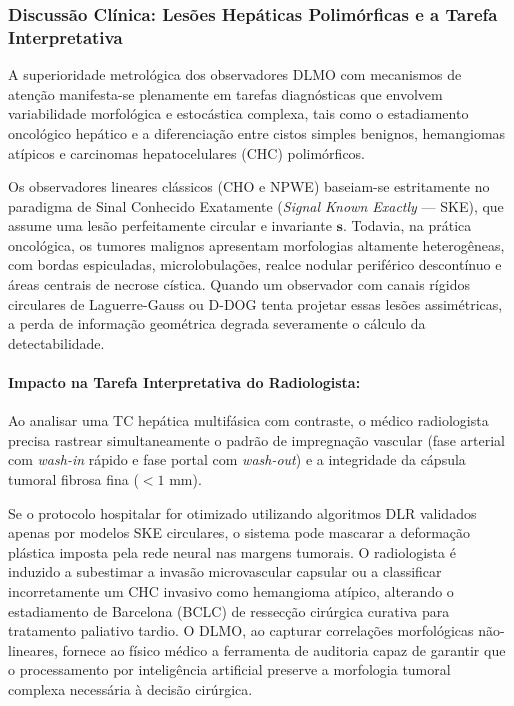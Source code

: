\documentclass[
  12pt,
  a4paper,
  oneside
]{report}
\begin{document}
\subsubsection{Discussão Clínica: Lesões Hepáticas Polimórficas e a Tarefa Interpretativa}
A superioridade metrológica dos observadores DLMO com mecanismos de atenção manifesta-se plenamente em tarefas diagnósticas que envolvem variabilidade morfológica e estocástica complexa, tais como o estadiamento oncológico hepático e a diferenciação entre cistos simples benignos, hemangiomas atípicos e carcinomas hepatocelulares (CHC) polimórficos.

Os observadores lineares clássicos (CHO e NPWE) baseiam-se estritamente no paradigma de Sinal Conhecido Exatamente (\emph{Signal Known Exactly} --- SKE), que assume uma lesão perfeitamente circular e invariante $\mathbf{s}$. Todavia, na prática oncológica, os tumores malignos apresentam morfologias altamente heterogêneas, com bordas espiculadas, microlobulações, realce nodular periférico descontínuo e áreas centrais de necrose cística. Quando um observador com canais rígidos circulares de Laguerre-Gauss ou D-DOG tenta projetar essas lesões assimétricas, a perda de informação geométrica degrada severamente o cálculo da detectabilidade.

\paragraph{Impacto na Tarefa Interpretativa do Radiologista:} Ao analisar uma TC hepática multifásica com contraste, o médico radiologista precisa rastrear simultaneamente o padrão de impregnação vascular (fase arterial com \emph{wash-in} rápido e fase portal com \emph{wash-out}) e a integridade da cápsula tumoral fibrosa fina ($< 1\text{ mm}$). 

Se o protocolo hospitalar for otimizado utilizando algoritmos DLR validados apenas por modelos SKE circulares, o sistema pode mascarar a deformação plástica imposta pela rede neural nas margens tumorais. O radiologista é induzido a subestimar a invasão microvascular capsular ou a classificar incorretamente um CHC invasivo como hemangioma atípico, alterando o estadiamento de Barcelona (BCLC) de ressecção cirúrgica curativa para tratamento paliativo tardio. O DLMO, ao capturar correlações morfológicas não-lineares, fornece ao físico médico a ferramenta de auditoria capaz de garantir que o processamento por inteligência artificial preserve a morfologia tumoral complexa necessária à decisão cirúrgica.
\end{document}
